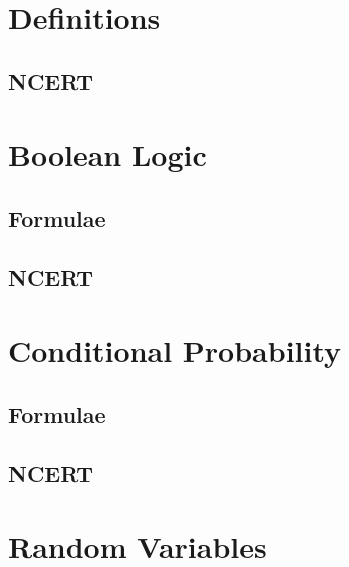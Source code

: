 \documentclass[journal]{IEEEtran}
\begin{document}
\newpage

\tableofcontents

\newpage



\section{Definitions}
\subsection{NCERT}

\section{Boolean Logic}
\subsection{Formulae}

\subsection{NCERT}


\newpage
\section{Conditional Probability}
\subsection{Formulae}

\subsection{NCERT}



\section{Random Variables}
\end{document}
